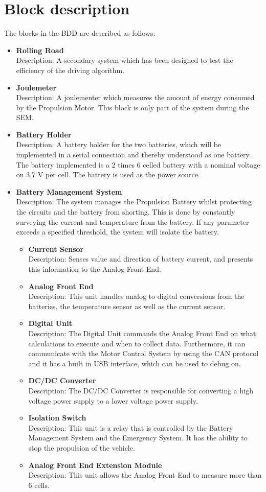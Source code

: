 \section{Block description}
The blocks in the BDD are described as follows:

\begin{itemize}
	\item \textbf{Rolling Road}\\
	Description: A secondary system which has been designed to test the efficiency of the driving algorithm.
	\item \textbf{Joulemeter}\\
	Description: A joulementer which measures the amount of energy consumed by the Propulsion Motor. This block is only part of the system during the SEM.
	\item \textbf{Battery Holder}\\
	Description: A battery holder for the two batteries, which will be implemented in a serial connection and thereby understood as one battery. The battery implemented is a 2 times 6 celled battery with a nominal voltage on 3.7 V per cell. The battery is used as the power source.
	\item \textbf{Battery Management System}\\
	Description: The system manages the Propulsion Battery whilst protecting the circuits and the battery from shorting. This is done by constantly surveying the current and temperature from the battery. If any parameter exceeds a specified threshold, the system will isolate the battery.
	\begin{itemize}
		\item \textbf{Current Sensor}\\
		Description: Senses value and direction of battery current, and presents this information to the Analog Front End.
		\item \textbf{Analog Front End}\\
		Description: This unit handles analog to digital conversions from the batteries, the temperature sensor as well as the current sensor.
		\item \textbf{Digital Unit}\\
		Description: The Digital Unit commands the Analog Front End on what calculations to execute and when to collect data. Furthermore, it can communicate with the Motor Control System by using the CAN protocol and it has a built in USB interface, which can be used to debug on. 
		\item \textbf{DC/DC Converter}\\
		Description: The DC/DC Converter is responsible for converting a high voltage power supply to a lower voltage power supply.
		\item \textbf{Isolation Switch}\\
		Description: This unit is a relay that is controlled by the Battery Management System and the Emergency System. It has the ability to stop the propulsion of the vehicle.
		\item \textbf{Analog Front End Extension Module}\\
		Description: This unit allows the Analog Front End to measure more than 6 cells. 
		

\end{itemize}
\end{itemize}
